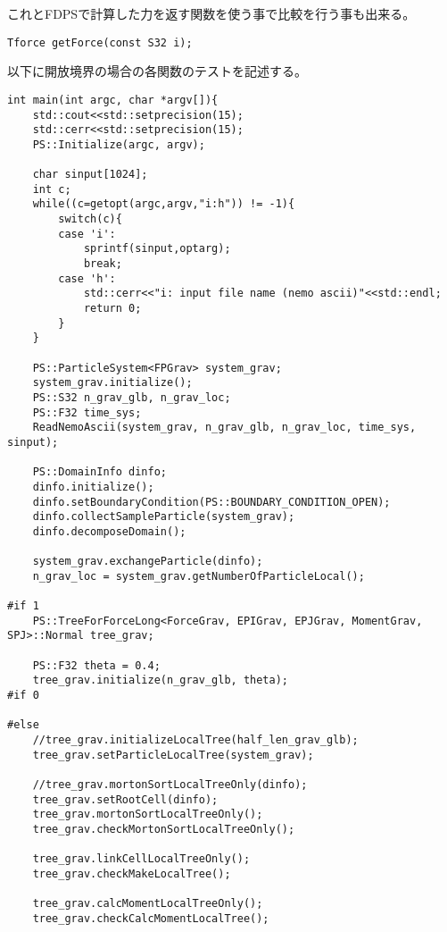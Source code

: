 これとFDPSで計算した力を返す関数を使う事で比較を行う事も出来る。
\begin{screen}
\begin{verbatim}
Tforce getForce(const S32 i);
\end{verbatim}
\end{screen}

以下に開放境界の場合の各関数のテストを記述する。

\begin{lstlisting}[caption=開放境界、モートンソート、ローカルツリー構築、モーメント計算、LET交換、グローバルツリー構築、相互作用計算のテスト]
int main(int argc, char *argv[]){
    std::cout<<std::setprecision(15);
    std::cerr<<std::setprecision(15);
    PS::Initialize(argc, argv);

    char sinput[1024];
    int c;
    while((c=getopt(argc,argv,"i:h")) != -1){
        switch(c){
        case 'i':
            sprintf(sinput,optarg);
            break;
        case 'h':
            std::cerr<<"i: input file name (nemo ascii)"<<std::endl;
            return 0;
        }
    }

    PS::ParticleSystem<FPGrav> system_grav;
    system_grav.initialize();
    PS::S32 n_grav_glb, n_grav_loc;
    PS::F32 time_sys;
    ReadNemoAscii(system_grav, n_grav_glb, n_grav_loc, time_sys, sinput);

    PS::DomainInfo dinfo;
    dinfo.initialize();
    dinfo.setBoundaryCondition(PS::BOUNDARY_CONDITION_OPEN);
    dinfo.collectSampleParticle(system_grav);
    dinfo.decomposeDomain();

    system_grav.exchangeParticle(dinfo);
    n_grav_loc = system_grav.getNumberOfParticleLocal();

#if 1
    PS::TreeForForceLong<ForceGrav, EPIGrav, EPJGrav, MomentGrav, SPJ>::Normal tree_grav;

    PS::F32 theta = 0.4;
    tree_grav.initialize(n_grav_glb, theta);
#if 0

#else
    //tree_grav.initializeLocalTree(half_len_grav_glb);
    tree_grav.setParticleLocalTree(system_grav);

    //tree_grav.mortonSortLocalTreeOnly(dinfo);
    tree_grav.setRootCell(dinfo);
    tree_grav.mortonSortLocalTreeOnly();
    tree_grav.checkMortonSortLocalTreeOnly();

    tree_grav.linkCellLocalTreeOnly();
    tree_grav.checkMakeLocalTree();

    tree_grav.calcMomentLocalTreeOnly();
    tree_grav.checkCalcMomentLocalTree();


\end{lstlisting}

